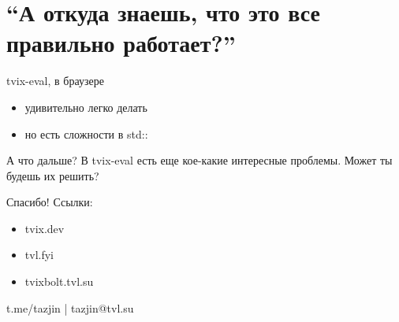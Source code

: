 \documentclass[12pt]{beamer}
\newenvironment{code}{\ttfamily}{\par}
\begin{document}
  \section{``А откуда знаешь, что это все правильно работает?''}


  \begin{frame}{tvix-eval, в браузере}
    \begin{itemize}
    \item удивительно легко делать
    \item но есть сложности в \begin{code}std::\end{code}
    \end{itemize}
  \end{frame}

  \begin{frame}{А что дальше?}
    В tvix-eval есть еще кое-какие интересные проблемы. Может ты
    будешь их решить?
  \end{frame}


  \begin{frame}{Спасибо!}
    Ссылки:
    \begin{itemize}
    \item tvix.dev
    \item tvl.fyi
    \item tvixbolt.tvl.su
    \end{itemize}

    \vspace{3cm}
    \begin{center}
      t.me/tazjin | tazjin@tvl.su
    \end{center}
  \end{frame}
\end{document}
